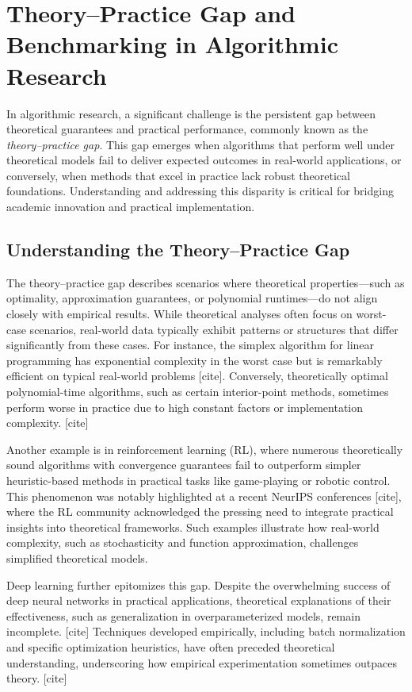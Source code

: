 \section{Theory–Practice Gap and Benchmarking in Algorithmic Research}
\label{sec:theory_practice_benchmarking}

In algorithmic research, a significant challenge is the persistent
gap between theoretical guarantees and practical performance,
commonly known as the \emph{theory–practice gap}. This gap emerges
when algorithms that perform well under theoretical
models fail to deliver expected outcomes in real-world applications,
or conversely, when methods that excel in practice lack robust
theoretical foundations. Understanding and addressing this disparity
is critical for bridging academic innovation and practical implementation.

\subsection{Understanding the Theory–Practice Gap}

The theory–practice gap describes scenarios where theoretical
properties—such as optimality, approximation guarantees, or
polynomial runtimes—do not align closely with empirical results.
While theoretical analyses often focus on worst-case scenarios,
real-world data typically exhibit patterns or structures that differ
significantly from these cases. For instance, the
simplex algorithm for linear programming has exponential complexity
in the worst case but is remarkably efficient on typical real-world
problems [cite]. Conversely, theoretically optimal polynomial-time
algorithms, such as certain interior-point methods, sometimes perform
worse in practice due to high constant factors or implementation
complexity. [cite]

Another example is in reinforcement learning (RL), where numerous
theoretically sound algorithms with convergence guarantees fail to
outperform simpler heuristic-based methods in practical tasks like
game-playing or robotic control. This phenomenon was notably
highlighted at a recent NeurIPS conferences [cite], where the RL community
acknowledged the pressing need to integrate practical insights into
theoretical frameworks. Such examples illustrate how real-world
complexity, such as stochasticity and function approximation,
challenges simplified theoretical models.

Deep learning further epitomizes this gap. Despite the overwhelming
success of deep neural networks in practical applications,
theoretical explanations of their effectiveness, such as
generalization in overparameterized models, remain incomplete. [cite]
Techniques developed empirically, including batch normalization and
specific optimization heuristics, have often preceded theoretical
understanding, underscoring how empirical experimentation sometimes
outpaces theory. [cite]

